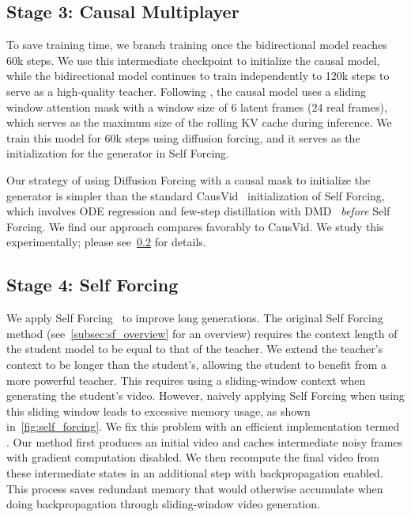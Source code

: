 \subsection{Stage 3: Causal Multiplayer}

To save training time, we branch training once the bidirectional model reaches 60k steps. We use this intermediate checkpoint to initialize the causal model, while the bidirectional model continues to train independently to 120k steps to serve as a high-quality teacher. Following \matrixgame, the causal model uses a sliding window attention mask with a window size of 6 latent frames (24 real frames), which serves as the maximum size of the rolling KV cache during inference. We train this model for 60k steps using diffusion forcing, and it serves as the initialization for the generator in Self Forcing. 

Our strategy of using Diffusion Forcing with a causal mask to initialize the generator is simpler than the standard CausVid~\cite{yin2025slowbidirectionalfastautoregressive} initialization of Self Forcing, which involves ODE regression and few-step distillation with DMD~\cite{yin2024one, yin2024improved} \textit{before} Self Forcing. We find our approach compares favorably to CausVid. We study this experimentally; please see~\cref{subsec:self-forcing} for details. 




\subsection{Stage 4: Self Forcing}
\label{subsec:self-forcing}
We apply Self Forcing~\cite{huang2025selfforcingbridgingtraintest} to improve long generations. The original Self Forcing method (see~\cref{subsec:sf_overview} for an overview) requires the context length of the student model to be equal to that of the teacher. We extend the teacher's context to be longer than the student's, allowing the student to benefit from a more powerful teacher. This requires using a sliding-window context when generating the student's video. However, naively applying Self Forcing when using this sliding window leads to excessive memory usage, as shown in~\cref{fig:self_forcing}. We fix this problem with an efficient implementation termed \textit{\oursf}. Our method first produces an initial video and caches intermediate noisy frames with gradient computation disabled. We then recompute the final video from these intermediate states in an additional step with backpropagation enabled. This process saves redundant memory that would otherwise accumulate when doing backpropagation through sliding-window video generation.

